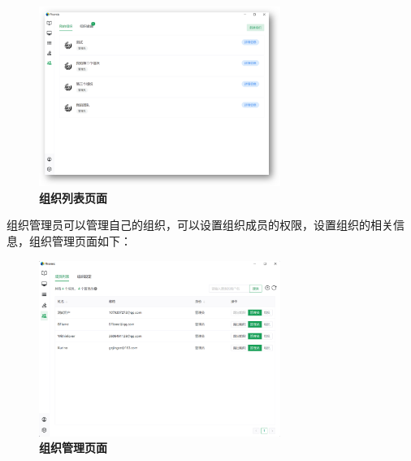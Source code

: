 \begin{figure}[H]
    \centering
    \includegraphics[width=0.7\textwidth]{figure/team1.png}
    \caption{\textbf{组织列表页面}}
    \label{fig:team1}
\end{figure}

组织管理员可以管理自己的组织，可以设置组织成员的权限，设置组织的相关信息，组织管理页面如下：

\begin{figure}[H]
    \centering
    \includegraphics[width=0.7\textwidth]{figure/team2.png}
    \caption{\textbf{组织管理页面}}
    \label{fig:team2}
\end{figure}
